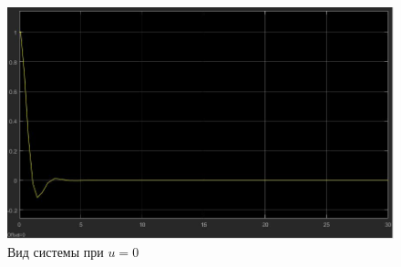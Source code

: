 \documentclass[a4paper, 12pt]{article}
\begin{document}
        \begin{figure}[H]
            \centering
            \includegraphics[scale=0.37]{1.3.jpg}
            \captionsetup{skip=0pt}
            \caption{Вид системы при $u = 0$}
            \label{fig:4imspdf}
        \end{figure}
\end{document}
